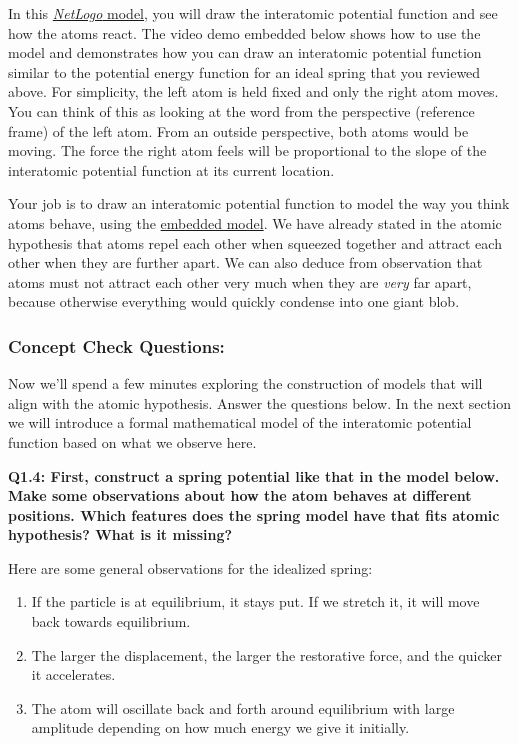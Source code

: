 \documentclass{book}
\providecommand{\tightlist}{%
  \setlength{\itemsep}{0pt}\setlength{\parskip}{0pt}}
\begin{document}
In this
\href{https://ct-stem.s3.amazonaws.com/uploads/jzkelter/2021/08/18/draw\%20potentials_2021-08-18-19-15-15-372549.html?speed=0.8}{\emph{NetLogo}
model}, you will draw the interatomic potential function and see how the atoms
react. The video demo embedded below shows how to use the model and
demonstrates how you can draw an interatomic potential function similar to the
potential energy function for an ideal spring that you reviewed above. For
simplicity, the left atom is held fixed and only the right atom moves. You can
think of this as looking at the word from the perspective (reference frame) of
the left atom. From an outside perspective, both atoms would be moving. The
force the right atom feels will be proportional to the slope of the
interatomic potential function at its current location.

Your job is to draw an interatomic potential function to model the way you
think atoms behave, using the \protect\hyperlink{SketchModel}{embedded model}.
We have already stated in the atomic hypothesis that atoms repel each other
when squeezed together and attract each other when they are further apart. We
can also deduce from observation that atoms must not attract each other very
much when they are \emph{very} far apart, because otherwise everything would
quickly condense into one giant blob.

\hypertarget{concept-check-questions-1}{%
\subsubsection{Concept Check Questions:}\label{concept-check-questions-1}}

Now we'll spend a few minutes exploring the construction of models that will
align with the atomic hypothesis. Answer the questions below. In the next
section we will introduce a formal mathematical model of the interatomic
potential function based on what we observe here.

\textbf{Q1.4: First, construct a spring potential like that in the model
below. Make some observations about how the atom behaves at different
positions. Which features does the spring model have that fits atomic
hypothesis? What is it missing?}

Here are some general observations for the idealized spring:

\begin{enumerate}
\def\labelenumi{\arabic{enumi}.}
\tightlist
\item
  If the particle is at equilibrium, it stays put. If we stretch it, it will
  move back towards equilibrium.
\item
  The larger the displacement, the larger the restorative force, and the
  quicker it accelerates.
\item
  The atom will oscillate back and forth around equilibrium with large
  amplitude depending on how much energy we give it initially.
\end{enumerate}
\end{document}
